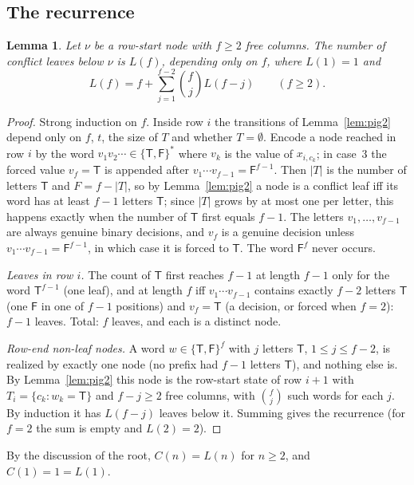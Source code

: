 \documentclass[11pt]{article}
\newtheorem{lemma}{Lemma}
\theoremstyle{definition}
\theoremstyle{remark}
\begin{document}
\subsection{The recurrence}
\begin{lemma}\label{lem:pig3}
Let $\nu$ be a row-start node with $f\ge2$ free columns. The number of conflict leaves below $\nu$ is
$L(f)$, depending only on $f$, where $L(1)=1$ and
\[
L(f)=f+\sum_{j=1}^{f-2}\binom fj L(f-j)\qquad(f\ge2).
\]
\end{lemma}
\begin{proof}
Strong induction on $f$. Inside row $i$ the transitions of Lemma~\ref{lem:pig2} depend only on
$f$, $t$, the size of $T$ and whether $T=\emptyset$. Encode a node reached in row $i$ by the word
$v_1v_2\cdots\in\{\mathsf T,\mathsf F\}^*$ where $v_k$ is the value of $x_{i,c_k}$; in case~3 the
forced value $v_f=\mathsf T$ is appended after $v_1\cdots v_{f-1}=\mathsf F^{f-1}$. Then $|T|$ is the
number of letters $\mathsf T$ and $F=f-|T|$, so by Lemma~\ref{lem:pig2} a node is a conflict leaf
iff its word has at least $f-1$ letters $\mathsf T$; since $|T|$ grows by at most one per letter, this
happens exactly when the number of $\mathsf T$ first equals $f-1$. The letters $v_1,\dots,v_{f-1}$ are
always genuine binary decisions, and $v_f$ is a genuine decision unless $v_1\cdots v_{f-1}=\mathsf F^{f-1}$,
in which case it is forced to $\mathsf T$. The word $\mathsf F^f$ never occurs.

\emph{Leaves in row $i$.} The count of $\mathsf T$ first reaches $f-1$ at length $f-1$ only for the
word $\mathsf T^{f-1}$ (one leaf), and at length $f$ iff $v_1\cdots v_{f-1}$ contains exactly $f-2$
letters $\mathsf T$ (one $\mathsf F$ in one of $f-1$ positions) and $v_f=\mathsf T$ (a decision, or
forced when $f=2$): $f-1$ leaves. Total: $f$ leaves, and each is a distinct node.

\emph{Row-end non-leaf nodes.} A word $w\in\{\mathsf T,\mathsf F\}^f$ with $j$ letters $\mathsf T$,
$1\le j\le f-2$, is realized by exactly one node (no prefix had $f-1$ letters $\mathsf T$), and
nothing else is. By Lemma~\ref{lem:pig2} this node is the row-start state of row $i{+}1$ with
$T_i=\{c_k:w_k=\mathsf T\}$ and $f-j\ge2$ free columns, with $\binom fj$ such words for each $j$.
By induction it has $L(f-j)$ leaves below it. Summing gives the recurrence (for $f=2$ the sum is empty
and $L(2)=2$).
\end{proof}

By the discussion of the root, $C(n)=L(n)$ for $n\ge2$, and $C(1)=1=L(1)$.
\end{document}
